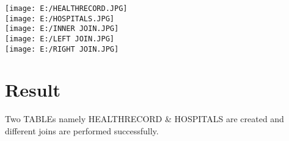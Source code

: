 \documentclass[100pt]{article}
\begin{document}
    \begin{flushleft}
    		    \texttt{[image: E:/HEALTHRECORD.JPG]}\\
    	
    	
              	\texttt{[image: E:/HOSPITALS.JPG]}\\
    	
    	
    	        \texttt{[image: E:/INNER JOIN.JPG]}\\
    	
    	
    	        \texttt{[image: E:/LEFT JOIN.JPG]}\\
    	
    	
    	        \texttt{[image: E:/RIGHT JOIN.JPG]}\\
    \end{flushleft}
    	
    	
    	\section{Result}
    	Two TABLEs namely HEALTHRECORD & HOSPITALS are created and different joins  are performed successfully.
    
\end{document}
